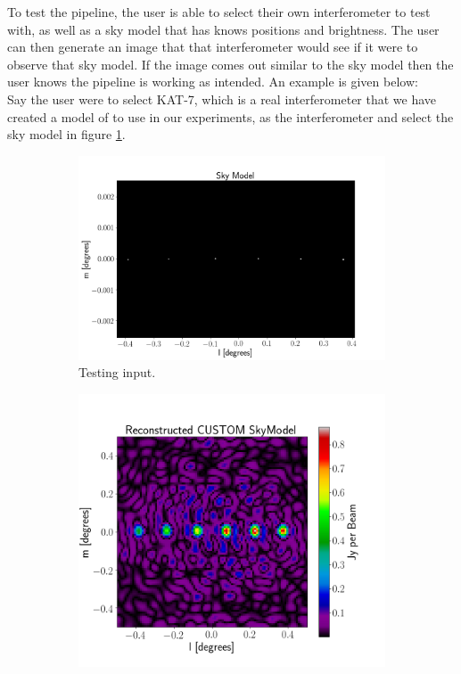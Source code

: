 To test the pipeline, the user is able to select their own interferometer to test with, as well as a sky model that has knows positions and brightness.
The user can then generate an image that that interferometer would see if it were to observe that sky model. If the image comes out similar to the sky model then the user knows the pipeline is working as intended. An example is given below: \\
Say the user were to select KAT-7\cite{KAT-7}, which is a real interferometer that we have created a model of to use in our experiments, as the interferometer and select the sky model in figure \ref{fig:line_model}.

\begin{figure}[H]
  \centering
  \begin{subfigure}[b]{0.49\textwidth}
    \centering
    \includegraphics[width=\textwidth, scale=1]{images/TESTING_KAT7_LINEMODEL_SKY_MODEL.png}
    \vspace*{3mm}
    \caption{Testing input.}
    \label{fig:line_model}
  \end{subfigure}
  \begin{subfigure}[b]{0.49\textwidth}
    \centering
    \includegraphics[scale=0.32]{images/TESTING_KAT7_LINEMODEL_RECON.png}

\end{subfigure}
\end{figure}
